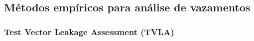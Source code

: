 
\subsection{Métodos empíricos para análise de vazamentos}

\subsubsection{Test Vector Leakage Assessment (TVLA)}



